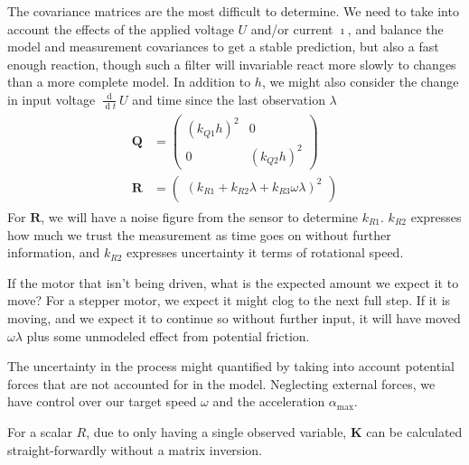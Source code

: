 \documentclass[12pt,a4paper,oneside,openany]{article}
\DeclareMathOperator{\ud}{d}
\newcommand{\mK}{\ensuremath{\mathbf{K}}}
\newcommand{\mP}{\ensuremath{\mathbf{P}}}
\newcommand{\mQ}{\ensuremath{\mathbf{Q}}}
\newcommand{\mR}{\ensuremath{\mathbf{R}}}
\begin{document}
The covariance matrices are the most difficult to determine. We need to take into account the effects of the applied voltage $U$ and/or current $\imath$, and balance the model and measurement covariances to get a stable prediction, but also a fast enough reaction, though such a filter will invariable react more slowly to changes than a more complete model. In addition to $h$, we might also consider the change in input voltage $\frac{\ud}{\ud t} U$ and time since the last observation $\lambda$
\begin{gather}
\begin{aligned}
\mQ &= \left(
\begin{array}{cc}
 \left( k_{Q1} h \right)^2 & 0 \\
 0 & \left( k_{Q2} h \right)^2
\end{array}
\right) \\
\mR &= \left(
\begin{array}{c}
 \left( k_{R1} + k_{R2} \lambda + k_{R3} \omega \lambda \right)^2\\
\end{array}
\right)
\end{aligned}
\end{gather}
For $\mR$, we will have a noise figure from the sensor to determine $k_{R1}$. $k_{R2}$ expresses how much we trust the measurement as time goes on without further information, and $k_{R2}$ expresses uncertainty it terms of rotational speed.

If the motor that isn't being driven, what is the expected amount we expect it to move? For a stepper motor, we expect it might clog to the next full step. If it is moving, and we expect it to continue so without further input, it will have moved $\omega \lambda$ plus some unmodeled effect from potential friction. 

The uncertainty in the process might quantified by taking into account potential forces that are not accounted for in the model. Neglecting external forces, we have control over our target speed $\omega$ and the acceleration $\alpha_{\textrm{max}}$.

For a scalar $R$, due to only having a single observed variable, $\mK$ can be calculated straight-forwardly without a matrix inversion.
\end{document}
